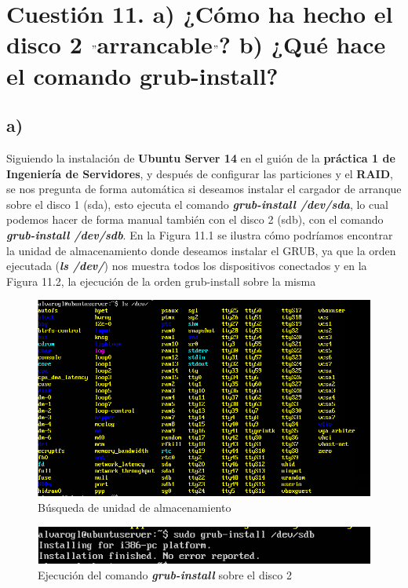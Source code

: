 \section{Cuestión 11. a) ¿Cómo ha hecho el disco 2 $"$arrancable$"$? b) ¿Qué hace el comando grub-install?}

\subsection{a)}
Siguiendo la instalación de \textbf{Ubuntu Server 14} en el guión de la \textbf{práctica 1 de Ingeniería de Servidores}, y después de configurar las particiones y el \textbf{RAID}, se nos pregunta de forma automática si deseamos instalar el cargador de arranque sobre el disco 1 (sda), esto ejecuta el comando \textbf{\textit{grub-install /dev/sda}}, lo cual podemos hacer de forma manual también con el disco 2 (sdb), con el comando \textbf{\textit{grub-install /dev/sdb}}.
En la Figura 11.1 se ilustra cómo podríamos encontrar la unidad de almacenamiento donde deseamos instalar el GRUB, ya que la orden ejecutada (\textbf{\textit{ls /dev/}}) nos muestra todos los dispositivos conectados y en la Figura 11.2, la ejecución de la orden grub-install sobre la misma

\begin{figure}[H] %
\centering
\includegraphics[scale=0.8]{cuestion11-unidades.PNG}  %
\caption{Búsqueda de unidad de almacenamiento} \label{fig:figura1}
\end{figure}

\begin{figure}[H] %
\centering
\includegraphics[scale=0.8]{cuestion11-grub-install.PNG}  %
\caption{Ejecución del comando \textbf{\textit{grub-install}} sobre el disco 2} \label{fig:figura1}
\end{figure}

